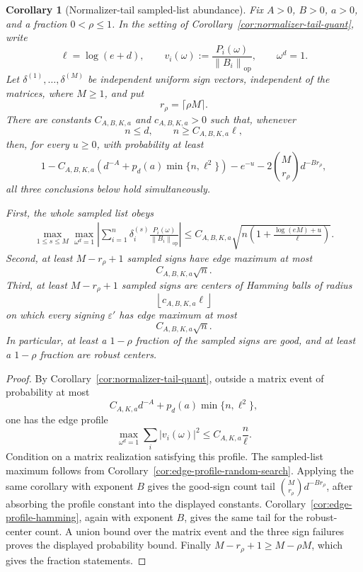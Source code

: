 \documentclass[11pt]{amsart}
\numberwithin{equation}{section}
\newtheorem{corollary}[theorem]{Corollary}
\theoremstyle{definition}
\theoremstyle{remark}
\newcommand{\op}{\mathrm{op}}
\newcommand{\norm}[1]{\left\lVert #1\right\rVert}
\newcommand{\eps}{\varepsilon}
\begin{document}
\begin{corollary}[Normalizer-tail sampled-list abundance]
\label{cor:normalizer-tail-abundance}
Fix \(A>0\), \(B>0\), \(a>0\), and a fraction \(0<\rho\le1\).  In the setting
of Corollary~\ref{cor:normalizer-tail-quant}, write
\[
  \ell=\log(e+d),\qquad
  v_i(\omega):=\frac{P_i(\omega)}{\norm{B_i}_{\op}},
  \qquad \omega^d=1.
\]
Let \(\delta^{(1)},\ldots,\delta^{(M)}\) be independent uniform sign vectors,
independent of the matrices, where \(M\ge1\), and put
\[
  r_\rho=\lceil \rho M\rceil .
\]
There are constants \(C_{A,B,K,a}\) and \(c_{A,B,K,a}>0\) such that, whenever
\[
  n\le d,\qquad n\ge C_{A,B,K,a}\ell ,
\]
then, for every \(u\ge0\), with probability at least
\[
  1-C_{A,B,K,a}\left(d^{-A}+p_d(a)\min\{n,\ell^2\}\right)
  -e^{-u}-2\binom{M}{r_\rho}d^{-B r_\rho},
\]
all three conclusions below hold simultaneously.

First, the whole sampled list obeys
\[
\begin{aligned}
  \max_{1\le s\le M}\max_{\omega^d=1}
  \left|\sum_{i=1}^n\delta_i^{(s)}
  \frac{P_i(\omega)}{\norm{B_i}_{\op}}\right|
  \le
  C_{A,B,K,a}\sqrt{
    n\left(1+\frac{\log(eM)+u}{\ell}\right)} .
\end{aligned}
\]
Second, at least \(M-r_\rho+1\) sampled signs have edge maximum at most
\[
  C_{A,B,K,a}\sqrt n .
\]
Third, at least \(M-r_\rho+1\) sampled signs are centers of Hamming balls of
radius
\[
  \left\lfloor c_{A,B,K,a}\ell\right\rfloor
\]
on which every signing \(\eps'\) has edge maximum at most
\[
  C_{A,B,K,a}\sqrt n .
\]
In particular, at least a \(1-\rho\) fraction of the sampled signs are good,
and at least a \(1-\rho\) fraction are robust centers.
\end{corollary}

\begin{proof}
By Corollary~\ref{cor:normalizer-tail-quant}, outside a matrix event of
probability at most
\[
  C_{A,K,a}d^{-A}+p_d(a)\min\{n,\ell^2\},
\]
one has the edge profile
\[
  \max_{\omega^d=1}\sum_i |v_i(\omega)|^2
  \le C_{A,K,a}\frac n\ell .
\]
Condition on a matrix realization satisfying this profile.  The sampled-list
maximum follows from Corollary~\ref{cor:edge-profile-random-search}.  Applying
the same corollary with exponent \(B\) gives the good-sign count tail
\(\binom{M}{r_\rho}d^{-B r_\rho}\), after absorbing the profile constant into
the displayed constants.  Corollary~\ref{cor:edge-profile-hamming}, again with
exponent \(B\), gives the same tail for the robust-center count.  A union bound
over the matrix event and the three sign failures proves the displayed
probability bound.  Finally \(M-r_\rho+1\ge M-\rho M\), which gives the
fraction statements.
\end{proof}
\end{document}
